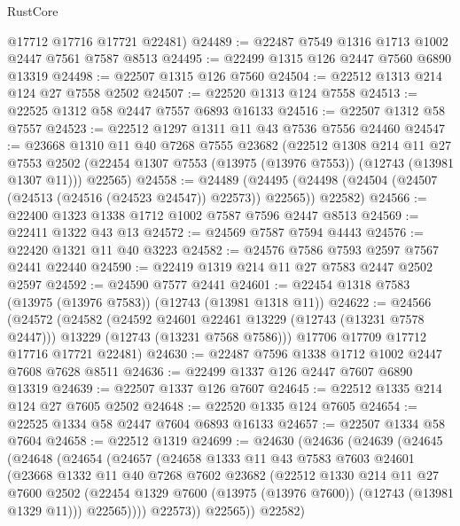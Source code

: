 \begin{lexlean}{RustCore}
\begin{coremodule}
      @17712
      @17716
      @17721
      @22481)
@24489 := @22487 @7549 @1316 @1713 @1002 @2447 @7561 @7587 @8513
@24495 := @22499 @1315 @126 @2447 @7560 @6890 @13319
@24498 := @22507 @1315 @126 @7560
@24504 := @22512 @1313 @214 @124 @27 @7558 @2502
@24507 := @22520 @1313 @124 @7558
@24513 := @22525 @1312 @58 @2447 @7557 @6893 @16133
@24516 := @22507 @1312 @58 @7557
@24523 := @22512 @1297 @1311 @11 @43 @7536 @7556 @24460
@24547 := @23668
    @1310
    @11
    @40
    @7268
    @7555
    @23682
    (@22512
      @1308
      @214
      @11
      @27
      @7553
      @2502
      (@22454 @1307 @7553 (@13975 (@13976 @7553)) (@12743 (@13981 @1307 @11)))
      @22565)
@24558 := @24489
    (@24495 (@24498 (@24504 (@24507 (@24513 (@24516 (@24523 @24547)) @22573)) @22565)) @22582)
@24566 := @22400 @1323 @1338 @1712 @1002 @7587 @7596 @2447 @8513
@24569 := @22411 @1322 @43 @13
@24572 := @24569 @7587 @7594 @4443
@24576 := @22420 @1321 @11 @40 @3223
@24582 := @24576 @7586 @7593 @2597 @7567 @2441 @22440
@24590 := @22419 @1319 @214 @11 @27 @7583 @2447 @2502 @2597
@24592 := @24590 @7577 @2441
@24601 := @22454 @1318 @7583 (@13975 (@13976 @7583)) (@12743 (@13981 @1318 @11))
@24622 := @24566
    (@24572
      (@24582
        (@24592 @24601 @22461 @13229 (@12743 (@13231 @7578 @2447)))
        @13229
        (@12743 (@13231 @7568 @7586)))
      @17706
      @17709
      @17712
      @17716
      @17721
      @22481)
@24630 := @22487 @7596 @1338 @1712 @1002 @2447 @7608 @7628 @8511
@24636 := @22499 @1337 @126 @2447 @7607 @6890 @13319
@24639 := @22507 @1337 @126 @7607
@24645 := @22512 @1335 @214 @124 @27 @7605 @2502
@24648 := @22520 @1335 @124 @7605
@24654 := @22525 @1334 @58 @2447 @7604 @6893 @16133
@24657 := @22507 @1334 @58 @7604
@24658 := @22512 @1319
@24699 := @24630
    (@24636
      (@24639
        (@24645
          (@24648
            (@24654
              (@24657
                (@24658
                  @1333
                  @11
                  @43
                  @7583
                  @7603
                  @24601
                  (@23668
                    @1332
                    @11
                    @40
                    @7268
                    @7602
                    @23682
                    (@22512
                      @1330
                      @214
                      @11
                      @27
                      @7600
                      @2502
                      (@22454 @1329 @7600 (@13975 (@13976 @7600)) (@12743 (@13981 @1329 @11)))
                      @22565))))
              @22573))
          @22565))
      @22582)

\end{coremodule}
\end{lexlean}
